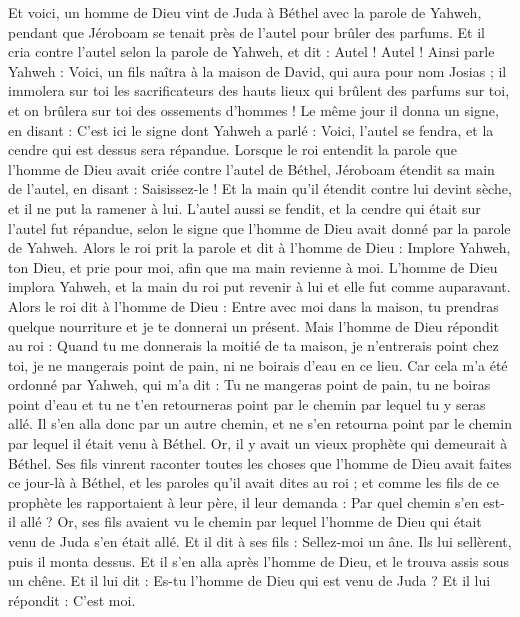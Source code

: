 \begin{multicols}{2}
\VerseOne{}Et voici, un homme de Dieu vint de Juda à Béthel avec la parole de Yahweh, pendant que Jéroboam se tenait près de l'autel pour brûler des parfums.
Et il cria contre l'autel selon la parole de Yahweh, et dit : Autel ! Autel ! Ainsi parle Yahweh : Voici, un fils naîtra à la maison de David, qui aura pour nom Josias ; il immolera sur toi les sacrificateurs des hauts lieux qui brûlent des parfums sur toi, et on brûlera sur toi des ossements d’hommes !
Le même jour il donna un signe, en disant : C'est ici le signe dont Yahweh a parlé : Voici, l'autel se fendra, et la cendre qui est dessus sera répandue.
Lorsque le roi entendit la parole que l'homme de Dieu avait criée contre l'autel de Béthel, Jéroboam étendit sa main de l'autel, en disant : Saisissez-le ! Et la main qu'il étendit contre lui devint sèche, et il ne put la ramener à lui.
L'autel aussi se fendit, et la cendre qui était sur l'autel fut répandue, selon le signe que l'homme de Dieu avait donné par la parole de Yahweh.
Alors le roi prit la parole et dit à l'homme de Dieu : Implore Yahweh, ton Dieu, et prie pour moi, afin que ma main revienne à moi. L'homme de Dieu implora Yahweh, et la main du roi put revenir à lui et elle fut comme auparavant.
Alors le roi dit à l'homme de Dieu : Entre avec moi dans la maison, tu prendras quelque nourriture et je te donnerai un présent.
Mais l'homme de Dieu répondit au roi : Quand tu me donnerais la moitié de ta maison, je n'entrerais point chez toi, je ne mangerais point de pain, ni ne boirais d'eau en ce lieu.
Car cela m'a été ordonné par Yahweh, qui m'a dit : Tu ne mangeras point de pain, tu ne boiras point d'eau et tu ne t'en retourneras point par le chemin par lequel tu y seras allé.
Il s'en alla donc par un autre chemin, et ne s'en retourna point par le chemin par lequel il était venu à Béthel.
Or, il y avait un vieux prophète qui demeurait à Béthel. Ses fils vinrent raconter toutes les choses que l'homme de Dieu avait faites ce jour-là à Béthel, et les paroles qu'il avait dites au roi ; et comme les fils de ce prophète les rapportaient à leur père,
il leur demanda : Par quel chemin s'en est-il allé ? Or, ses fils avaient vu le chemin par lequel l'homme de Dieu qui était venu de Juda s'en était allé.
Et il dit à ses fils : Sellez-moi un âne. Ils lui sellèrent, puis il monta dessus.
Et il s'en alla après l'homme de Dieu, et le trouva assis sous un chêne. Et il lui dit : Es-tu l'homme de Dieu qui est venu de Juda ? Et il lui répondit : C'est moi.

\end{multicols}
